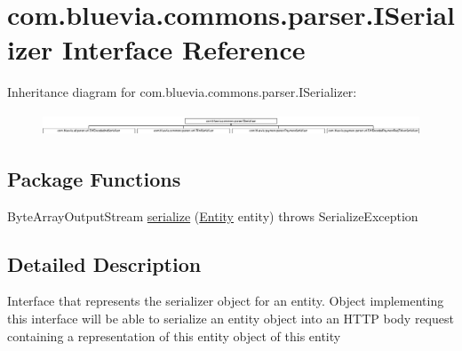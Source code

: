 \hypertarget{interfacecom_1_1bluevia_1_1commons_1_1parser_1_1ISerializer}{
\section{com.bluevia.commons.parser.ISerializer Interface Reference}
\label{interfacecom_1_1bluevia_1_1commons_1_1parser_1_1ISerializer}
}
Inheritance diagram for com.bluevia.commons.parser.ISerializer:\begin{figure}[H]
\begin{center}
\leavevmode
\includegraphics[height=0.657277cm]{interfacecom_1_1bluevia_1_1commons_1_1parser_1_1ISerializer}
\end{center}
\end{figure}
\subsection*{Package Functions}
\begin{DoxyCompactItemize}
\item 
ByteArrayOutputStream \hyperlink{interfacecom_1_1bluevia_1_1commons_1_1parser_1_1ISerializer_ad5554da8b85ab32d46d60e46bc563349}{serialize} (\hyperlink{interfacecom_1_1bluevia_1_1commons_1_1Entity}{Entity} entity)  throws SerializeException
\end{DoxyCompactItemize}


\subsection{Detailed Description}
Interface that represents the serializer object for an entity. Object implementing this interface will be able to serialize an entity object into an HTTP body request containing a representation of this entity object of this entity 

